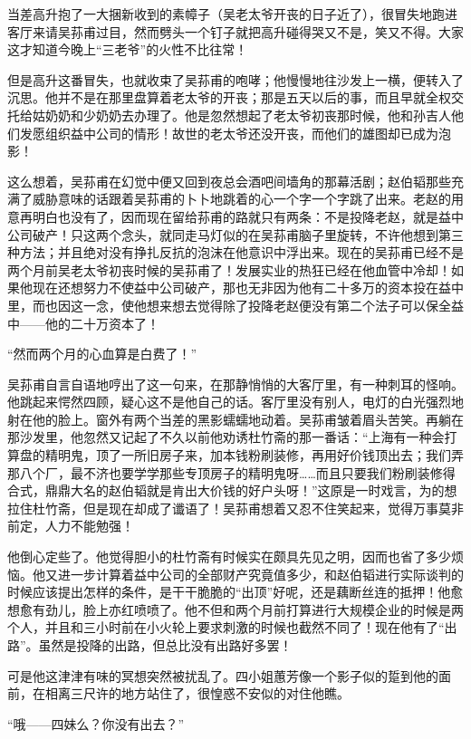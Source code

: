 \par 当差高升抱了一大捆新收到的素幛子（吴老太爷开丧的日子近了），很冒失地跑进客厅来请吴荪甫过目，然而劈头一个钉子就把高升碰得哭又不是，笑又不得。大家这才知道今晚上“三老爷”的火性不比往常！
\par 但是高升这番冒失，也就收束了吴荪甫的咆哮；他慢慢地往沙发上一横，便转入了沉思。他并不是在那里盘算着老太爷的开丧；那是五天以后的事，而且早就全权交托给姑奶奶和少奶奶去办理了。他是忽然想起了老太爷初丧那时候，他和孙吉人他们发愿组织益中公司的情形！故世的老太爷还没开丧，而他们的雄图却已成为泡影！
\par 这么想着，吴荪甫在幻觉中便又回到夜总会酒吧间墙角的那幕活剧；赵伯韬那些充满了威胁意味的话跟着吴荪甫的卜卜地跳着的心一个字一个字跳了出来。老赵的用意再明白也没有了，因而现在留给荪甫的路就只有两条：不是投降老赵，就是益中公司破产！只这两个念头，就同走马灯似的在吴荪甫脑子里旋转，不许他想到第三种方法；并且绝对没有挣扎反抗的泡沫在他意识中浮出来。现在的吴荪甫已经不是两个月前吴老太爷初丧时候的吴荪甫了！发展实业的热狂已经在他血管中冷却！如果他现在还想努力不使益中公司破产，那也无非因为他有二十多万的资本投在益中里，而也因这一念，使他想来想去觉得除了投降老赵便没有第二个法子可以保全益中——他的二十万资本了！
\par “然而两个月的心血算是白费了！”
\par 吴荪甫自言自语地哼出了这一句来，在那静悄悄的大客厅里，有一种刺耳的怪响。他跳起来愕然四顾，疑心这不是他自己的话。客厅里没有别人，电灯的白光强烈地射在他的脸上。窗外有两个当差的黑影蠕蠕地动着。吴荪甫皱着眉头苦笑。再躺在那沙发里，他忽然又记起了不久以前他劝诱杜竹斋的那一番话：“上海有一种会打算盘的精明鬼，顶了一所旧房子来，加本钱粉刷装修，再用好价钱顶出去；我们弄那八个厂，最不济也要学学那些专顶房子的精明鬼呀……而且只要我们粉刷装修得合式，鼎鼎大名的赵伯韬就是肯出大价钱的好户头呀！”这原是一时戏言，为的想拉住杜竹斋，但是现在却成了谶语了！吴荪甫想着又忍不住笑起来，觉得万事莫非前定，人力不能勉强！
\par 他倒心定些了。他觉得胆小的杜竹斋有时候实在颇具先见之明，因而也省了多少烦恼。他又进一步计算着益中公司的全部财产究竟值多少，和赵伯韬进行实际谈判的时候应该提出怎样的条件，是干干脆脆的“出顶”好呢，还是藕断丝连的抵押！他愈想愈有劲儿，脸上亦红喷喷了。他不但和两个月前打算进行大规模企业的时候是两个人，并且和三小时前在小火轮上要求刺激的时候也截然不同了！现在他有了“出路”。虽然是投降的出路，但总比没有出路好多罢！
\par 可是他这津津有味的冥想突然被扰乱了。四小姐蕙芳像一个影子似的踅到他的面前，在相离三尺许的地方站住了，很惶惑不安似的对住他瞧。
\par “哦——四妹么？你没有出去？”

